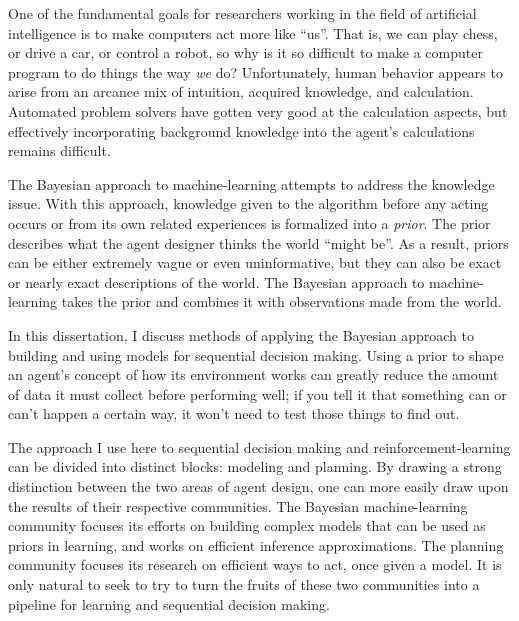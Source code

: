 
One of the fundamental goals for researchers working in the field of artificial intelligence is to make computers act more like ``us''. That is, we can play chess, or drive a car, or control a robot, so why is it so difficult to make a computer program to do things the way \emph{we} do? Unfortunately, human behavior appears to arise from an arcance mix of intuition, acquired knowledge, and calculation. Automated problem solvers have gotten very good at the calculation aspects, but effectively incorporating background knowledge into the agent's calculations remains difficult.

The Bayesian approach to machine-learning attempts to address the knowledge issue. With this approach, knowledge given to the algorithm before any acting occurs or from its own related experiences is formalized into a \emph{prior}. The prior describes what the agent  designer thinks the world ``might be''. As a result, priors can be either extremely vague or even uninformative, but they can also be exact or nearly exact descriptions of the world. The Bayesian approach to machine-learning takes the prior and combines it with observations made from the world.

In this dissertation, I discuss methods of applying the Bayesian approach to building and using models for sequential decision making. Using a prior to shape an agent's concept of how its environment works can greatly reduce the amount of data it must collect before performing well; if you tell it that something can or can't happen a certain way, it won't need to test those things to find out.


The approach I use here to sequential decision making and reinforcement-learning can be divided into distinct blocks: modeling and planning. By drawing a strong distinction between the two areas of agent design, one can more easily draw upon the results of their respective communities. The Bayesian machine-learning community focuses its efforts on building complex models that can be used as priors in learning, and works on efficient inference approximations. The planning community focuses its research on efficient ways to act, once given a model. It is only natural to seek to try to turn the fruits of these two communities into a pipeline for learning and sequential decision making.

